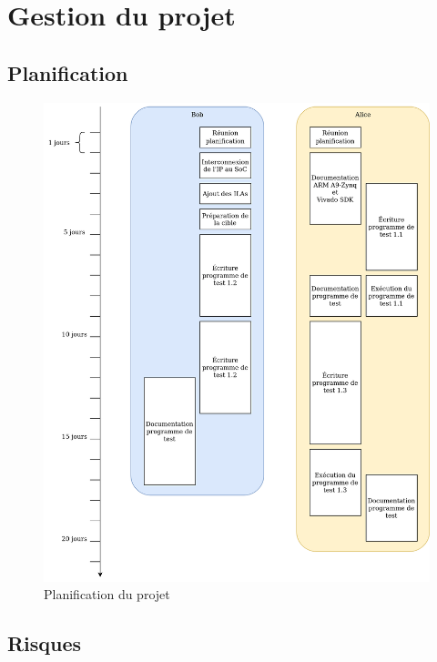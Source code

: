 \section{Gestion du projet}


\subsection{Planification}

\begin{figure}[H]
	\centering
	\includegraphics[width=0.7\linewidth]{figure/planning_integration.png}
	\caption{Planification du projet}
	\label{fig:planification}
\end{figure}

\subsection{Risques}


